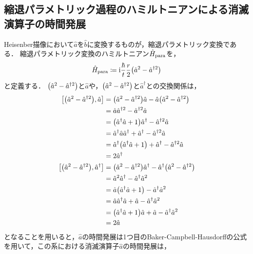 \documentclass{report}
\begin{document}
  \subsection{縮退パラメトリック過程のハミルトニアンによる消滅演算子の時間発展}
    Heisenber描像において$\hat{a}$を$\hat{b}$に変換するものが，縮退パラメトリック変換である．
    縮退パラメトリック変換のハミルトニアン$\hat{H}_{\mathrm{para}}$を，
    \begin{align}
      \hat{H}_{\mathrm{para}} \coloneqq \mathrm{i}\frac{\hbar}{t}\frac{r}{2}\qty(\hat{a}^2 - \hat{a}^{\dag 2})
    \end{align}
    と定義する．
    $\qty(\hat{a}^2 - \hat{a}^{\dag 2})$と$\hat{a}$や，$\qty(\hat{a}^2 - \hat{a}^{\dag 2})$と$\hat{a}^{\dag}$との交換関係は，
    \begin{align}
      \qty[\qty(\hat{a}^2 - \hat{a}^{\dag 2}), \hat{a}] &= \qty(\hat{a}^2 - \hat{a}^{\dag 2})\hat{a} - \hat{a}\qty(\hat{a}^2 - \hat{a}^{\dag 2}) \\ 
      &= \hat{a}\hat{a}^{\dag 2} - \hat{a}^{\dag 2}\hat{a} \\ 
      &= \qty(\hat{a}^{\dag}\hat{a} + 1)\hat{a}^{\dag} - \hat{a}^{\dag 2}\hat{a} \\ 
      &= \hat{a}^{\dag}\hat{a}\hat{a}^{\dag} + \hat{a}^{\dag} - \hat{a}^{\dag 2}\hat{a} \\ 
      &= \hat{a}^{\dag}\qty(\hat{a}^{\dag}\hat{a} + 1) + \hat{a}^{\dag} - \hat{a}^{\dag 2}\hat{a} \\ 
      &= 2\hat{a}^{\dag} \\ 
      \qty[\qty(\hat{a}^2 - \hat{a}^{\dag 2}), \hat{a}^{\dag}] &= \qty(\hat{a}^2 - \hat{a}^{\dag 2})\hat{a}^{\dag} - \hat{a}^{\dag}\qty(\hat{a}^2 - \hat{a}^{\dag 2}) \\ 
      &= \hat{a}^2\hat{a}^{\dag} - \hat{a}^{\dag}\hat{a}^2 \\ 
      &= \hat{a}\qty(\hat{a}^{\dag}\hat{a} + 1) - \hat{a}^{\dag}\hat{a}^2 \\ 
      &= \hat{a}\hat{a}^{\dag}\hat{a} + \hat{a} - \hat{a}^{\dag}\hat{a}^2 \\ 
      &= \qty(\hat{a}^{\dag}\hat{a} + 1)\hat{a} + \hat{a} - \hat{a}^{\dag}\hat{a}^2 \\ 
      &= 2\hat{a}
    \end{align}
    となることを用いると，$\hat{a}$の時間発展は1つ目のBaker-Campbell-Hausdorffの公式を用いて，この系における消滅演算子$\hat{a}$の時間発展は，
\end{document}
